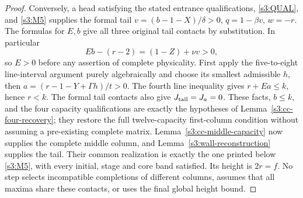 \documentclass[11pt,reqno]{amsart}
\theoremstyle{definition}
\theoremstyle{remark}
\begin{document}
\begin{proof}
Conversely, a head satisfying the stated entrance qualifications,
\eqref{s3:QUAL}, and \eqref{s3:M5} supplies the formal tail
\(v=(b-1-X)/\delta>0\), \(q=1-\beta v\), \(w=-r\).
The formulas for \(E,b\) give all three original tail contacts by
substitution. In particular
\[
 Eb-(r-2)=(1-Z)+\nu v>0,
\]
so \(E>0\) before any assertion of complete physicality.
First apply the five-to-eight line-interval argument purely
algebraically and choose its smallest admissible \(h\), then
\(a=(r-1-Y+\Gamma h)/t>0\). The fourth line inequality gives
\(r+Ea\le k\), hence \(r<k\).
The formal tail contacts also give \(J_{\rm tail}=J_a=0\).
These facts, \(b\le k\), and the four capacity qualifications are
exactly the hypotheses of Lemma~\ref{s3:cc-four-recovery}; they
restore the full twelve-capacity first-column condition without
assuming a pre-existing complete matrix.
Lemma~\ref{s3:cc-middle-capacity} now supplies the complete middle
column, and Lemma~\ref{s3:wall-reconstruction} supplies the tail.
Their common realization is exactly the one printed below
\eqref{s3:M5}, with every initial, stage and core band satisfied.
Its height is \(2r=f\). No step selects incompatible completions of
different columns, assumes that all maxima share these contacts, or
uses the final global height bound.
\end{proof}
\end{document}
